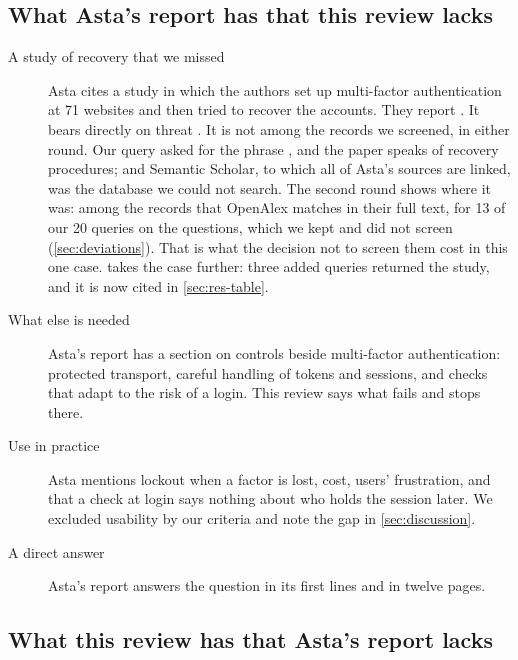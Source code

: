 \begin{refsection}
\subsection{What Asta's report has that this review lacks}

\begin{description}
  \item[A study of recovery that we missed] Asta cites a study in which
    the authors set up multi-factor authentication at 71 websites and
    then tried to recover the accounts.
    They report
    .
    It bears directly on threat .
    It is not among the records we screened, in either round.
    Our query asked for the phrase , and the paper
    speaks of recovery procedures; and Semantic Scholar, to which all of
    Asta's sources are linked, was the database we could not search.
    The second round shows where it was: among the records that OpenAlex
    matches in their full text, for 13 of our 20 queries on the questions, which we kept
    and did not screen (\cref{sec:deviations}).
    That is what the decision not to screen them cost in this one
    case.
     takes the case further: three added queries
    returned the study, and it is now cited in \cref{sec:res-table}.
  \item[What else is needed] Asta's report has a section on controls
    beside multi-factor authentication: protected transport, careful
    handling of tokens and sessions, and checks that adapt to the risk
    of a login.
    This review says what fails and stops there.
  \item[Use in practice] Asta mentions lockout when a factor is lost,
    cost, users' frustration, and that a check at login says nothing
    about who holds the session later.
    We excluded usability by our criteria and note the gap in
    \cref{sec:discussion}.
  \item[A direct answer] Asta's report answers the question in its
    first lines and in twelve pages.
\end{description}

\subsection{What this review has that Asta's report lacks}


\end{refsection}
